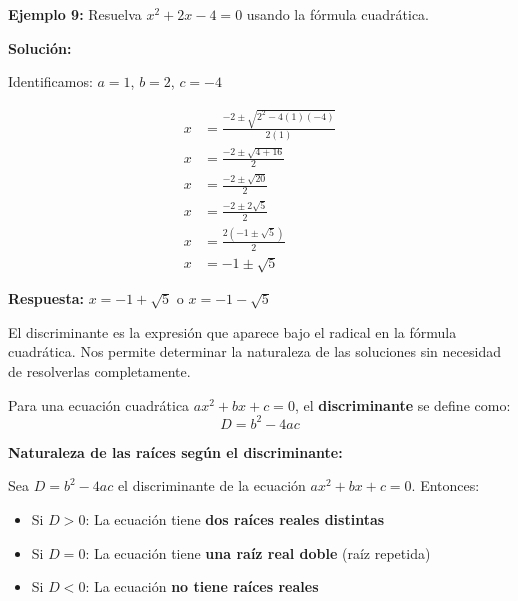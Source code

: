 \begin{example}
\textbf{Ejemplo 9:} Resuelva $x^2 + 2x - 4 = 0$ usando la fórmula cuadrática.

\textbf{Solución:}

Identificamos: $a = 1$, $b = 2$, $c = -4$

\begin{align}
x &= \frac{-2 \pm \sqrt{2^2 - 4(1)(-4)}}{2(1)}\\
x &= \frac{-2 \pm \sqrt{4 + 16}}{2}\\
x &= \frac{-2 \pm \sqrt{20}}{2}\\
x &= \frac{-2 \pm 2\sqrt{5}}{2}\\
x &= \frac{2(-1 \pm \sqrt{5})}{2}\\
x &= -1 \pm \sqrt{5}
\end{align}

\textbf{Respuesta:} $x = -1 + \sqrt{5}$ o $x = -1 - \sqrt{5}$
\end{example}

\newpage

El discriminante es la expresión que aparece bajo el radical en la fórmula cuadrática. Nos permite determinar la naturaleza de las soluciones sin necesidad de resolverlas completamente.

\begin{definition}
Para una ecuación cuadrática $ax^2 + bx + c = 0$, el \textbf{discriminante} se define como:
$$D = b^2 - 4ac$$
\end{definition}

\begin{theorem}
\textbf{Naturaleza de las raíces según el discriminante:}

Sea $D = b^2 - 4ac$ el discriminante de la ecuación $ax^2 + bx + c = 0$. Entonces:

\begin{itemize}
\item Si $D > 0$: La ecuación tiene \textbf{dos raíces reales distintas}
\item Si $D = 0$: La ecuación tiene \textbf{una raíz real doble} (raíz repetida)
\item Si $D < 0$: La ecuación \textbf{no tiene raíces reales}
\end{itemize}
\end{theorem}

